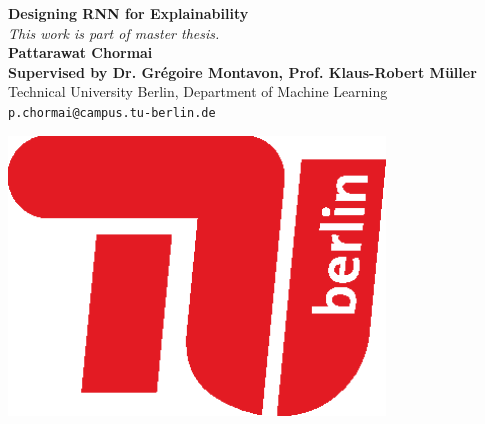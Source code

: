 \documentclass[a0,portrait]{a0poster}
\begin{document}


\begin{minipage}[b]{0.75\linewidth}
\veryHuge \textbf{Designing RNN for Explainability} \\ %
\large \textit{This work is part of master thesis.}\\[2cm] %
\huge \textbf{Pattarawat Chormai} \\ [0.5cm]
\huge \textbf{Supervised by Dr. Gr\'{e}goire Montavon, Prof. Klaus-Robert M\"{u}ller} \\[0.5cm] %
\huge Technical University Berlin, Department of Machine Learning \\[0.4cm] %
\Large \texttt{p.chormai@campus.tu-berlin.de} \\
\end{minipage}
%
\begin{minipage}[b]{0.25\linewidth}
\includegraphics[width=10cm]{tub-logo}\\
\end{minipage}

\vspace{1cm} %

\end{document}
